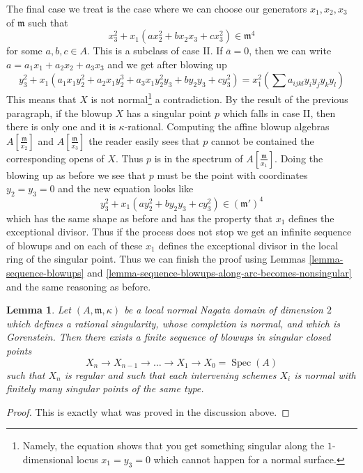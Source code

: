 \documentclass{stacks-project}
\theoremstyle{plain}
\newtheorem{lemma}[subsection]{Lemma}
\theoremstyle{definition}
\theoremstyle{remark}
\numberwithin{equation}{subsection}
\def\Spec{\mathop{\mathrm{Spec}}}
\begin{document}
\medskip\noindent
The final case we treat is the case where we can choose our generators
$x_1, x_2, x_3$ of $\mathfrak m$ such that
$$
x_3^2 + x_1(a x_2^2 + b x_2x_3 + c x_3^2) \in \mathfrak m^4
$$
for some $a, b, c \in A$. This is a subclass of case II. If
$\overline{a} = 0$, then we can write
$a = a_1 x_1 + a_2 x_2 + a_3 x_3$ and we get after blowing up
$$
y_3^2 + x_1(a_1 x_1 y_2^2 + a_2 x_1 y_2^3 + a_3 x_1 y_2^2 y_3 +
b y_2 y_3 + c y_3^2) = x_1^2 (\sum a_{ijkl}y_iy_jy_ky_l)
$$
This means that $X$ is not normal\footnote{Namely, the
equation shows that you get something singular along the
$1$-dimensional locus $x_1 = y_3 = 0$ which cannot happen
for a normal surface.} a contradiction. By the result
of the previous paragraph, if the blowup $X$
has a singular point $p$ which falls in case II, then
there is only one and it is $\kappa$-rational.
Computing the affine blowup algebras
$A[\frac{\mathfrak m}{x_2}]$ and $A[\frac{\mathfrak m}{x_3}]$
the reader easily sees that $p$ cannot be contained
the corresponding opens of $X$. Thus $p$ is in the spectrum
of $A[\frac{\mathfrak m}{x_1}]$. Doing the blowing up as before we see that
$p$ must be the point with coordinates $y_2 = y_3 = 0$ and the new
equation looks like
$$
y_3^2 + x_1(a y_2^2 + b y_2 y_3 + c y_3^2) \in (\mathfrak m')^4
$$
which has the same shape as before and has the property
that $x_1$ defines the exceptional divisor. Thus if the process
does not stop we get an infinite sequence of blowups and on
each of these $x_1$ defines the exceptional divisor in the
local ring of the singular point. Thus we can
finish the proof using
Lemmas \ref{lemma-sequence-blowups} and
\ref{lemma-sequence-blowups-along-arc-becomes-nonsingular}
and the same reasoning as before.

\begin{lemma}
\label{lemma-resolve-rational-double-points}
Let $(A, \mathfrak m, \kappa)$ be a local normal Nagata
domain of dimension $2$ which defines a rational singularity,
whose completion is normal, and which is Gorenstein.
Then there exists a finite sequence of blowups in
singular closed points
$$
X_n \to X_{n - 1} \to \ldots \to X_1 \to X_0 = \Spec(A)
$$
such that $X_n$ is regular and such that each intervening
schemes $X_i$ is normal with finitely many singular points
of the same type.
\end{lemma}

\begin{proof}
This is exactly what was proved in the discussion above.
\end{proof}
\end{document}
